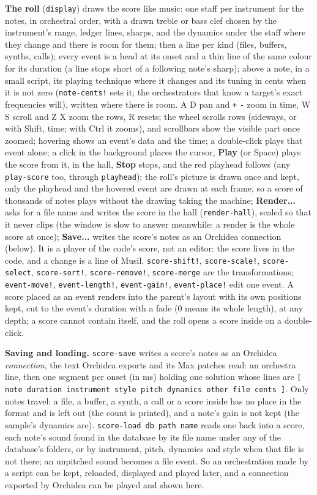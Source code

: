 \documentclass[11pt,a4paper]{article}
\newcommand{\musil}[1]{\lstinline[style=musilinline]{#1}}
\begin{document}
\textbf{The roll} (\musil{display}) draws the score like music: one staff per instrument
for the notes, in orchestral order, with a drawn treble or bass clef chosen by the
instrument's range, ledger lines, sharps, and the dynamics under the staff where they
change and there is room for them; then a line per kind (files, buffers, synths, calls);
every event is a head at its onset and a thin line of the same colour for its duration
(a line stops short of a following note's sharp); above a note, in a small script, its
playing technique where it changes and its tuning in cents when it is not zero
(\musil{note-cents!} sets it; the orchestrators that know a target's exact frequencies
will), written where there is room. A D pan and \texttt{+} \texttt{-} zoom in
time, W S scroll and Z X zoom the rows, R resets; the wheel scrolls rows (sideways, or with
Shift, time; with Ctrl it zooms), and scrollbars show the visible part once zoomed;
hovering shows an event's data and the time; a double-click plays that event alone; a
click in the background places the cursor, \textbf{Play} (or Space) plays the score from
it, in the hall, \textbf{Stop} stops, and the red playhead follows (any \musil{play-score}
too, through \musil{playhead}); the roll's picture is drawn once and kept, only the
playhead and the hovered event are drawn at each frame, so a score of thousands of notes
plays without the drawing taking the machine; \textbf{Render...} asks for a file name and writes the
score in the hall (\musil{render-hall}), scaled so that it never clips (the window is slow
to answer meanwhile: a render is the whole score at once); \textbf{Save...} writes the
score's notes as an Orchidea connection (below). It is a player of the code's score, not an editor: the
score lives in the code, and a change is a line of Musil. \musil{score-shift!}, \musil{score-scale!},
\musil{score-select}, \musil{score-sort!}, \musil{score-remove!}, \musil{score-merge} are the
transformations; \musil{event-move!}, \musil{event-length!}, \musil{event-gain!},
\musil{event-place!} edit one event. A score placed as an event renders into the parent's
layout with its own positions kept, cut to the event's duration with a fade (0 means its
whole length), at any depth; a score cannot contain itself, and the roll opens a score
inside on a double-click.

\textbf{Saving and loading.} \musil{score-save} writes a score's notes as an Orchidea
\emph{connection}, the text Orchidea exports and its Max patches read: an orchestra line,
then one segment per onset (in ms) holding one solution whose lines are \musil{[ note
duration instrument style pitch dynamics other file cents ]}. Only notes travel: a file, a
buffer, a synth, a call or a score inside has no place in the format and is left out
(the count is printed), and a note's gain is not kept (the sample's dynamics are).
\musil{score-load db path name} reads one back into a score, each note's sound found in
the database by its file name under any of the database's folders, or by instrument,
pitch, dynamics and style when that file is not there; an unpitched sound becomes a file
event. So an orchestration made by a script can be kept, reloaded, displayed and played
later, and a connection exported by Orchidea can be played and shown here.
\end{document}
